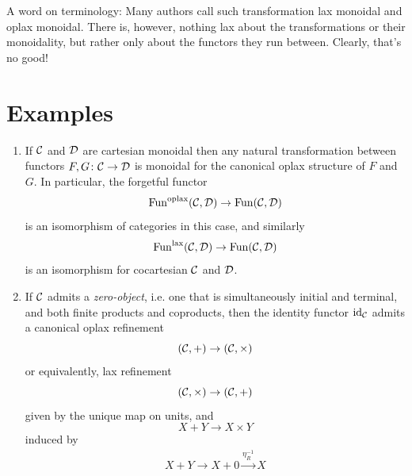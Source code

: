         A word on terminology: Many authors call such transformation lax monoidal and oplax monoidal. There is, however, nothing lax about the transformations or their monoidality, but rather only about the functors they run between. Clearly, that's no good!

    \section{Examples}
        \begin{enumerate}[label=\roman*)]
            \item
                If $\mathcal{C}$ and $\mathcal{D}$ are cartesian monoidal then any natural transformation between functors $F, G \colon \mathcal{C} \to \mathcal{D}$ is monoidal for the canonical oplax structure of $F$ and $G$. In particular, the forgetful functor
                \begin{equation*}
                    \operatorname{Fun}^{\operatorname{oplax}}(\mathcal{C}, \mathcal{D}) \to \operatorname{Fun}(\mathcal{C}, \mathcal{D})
                \end{equation*}
                is an isomorphism of categories in this case, and  similarly
                \begin{equation*}
                    \operatorname{Fun}^{\operatorname{lax}}(\mathcal{C}, \mathcal{D}) \to \operatorname{Fun}(\mathcal{C}, \mathcal{D})
                \end{equation*}
                is an isomorphism for cocartesian $\mathcal{C}$ and $\mathcal{D}$.\label{chIV-8-i}
            \item
                If $\mathcal{C}$ admits a \emph{zero-object}, i.e. one that is simultaneously initial and terminal, and both finite products and coproducts, then the identity functor $\operatorname{id}_{\mathcal{C}}$ admits a canonical oplax refinement
                \begin{equation*}
                    (\mathcal{C}, +) \to (\mathcal{C}, \times)
                \end{equation*}
                or equivalently, lax refinement
                \begin{equation*}
                    (\mathcal{C}, \times) \to (\mathcal{C}, +)
                \end{equation*}
                given by the unique map on units, and
                \begin{equation*}
                    X + Y \to X \times Y
                \end{equation*}
                induced by
                \begin{gather*}
                    X + Y \longrightarrow X + 0 \overset{\eta^{-1}_R}{\longrightarrow} X \\

\end{gather*}
\end{enumerate}
